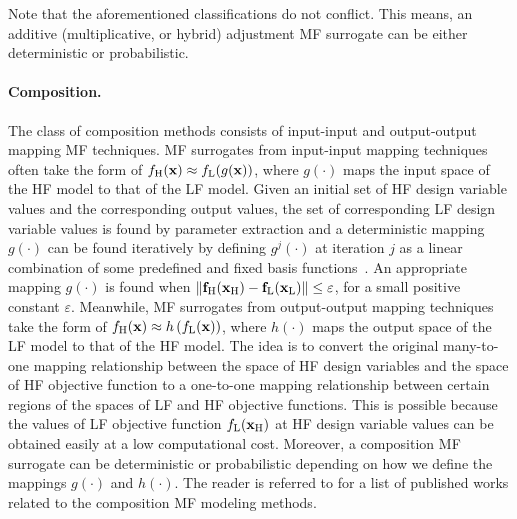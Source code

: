 \documentclass[iicol,sn-basic]{sn-jnl}%
\newcommand{\edit}[1]{\textcolor{red}{#1}} %
\begin{document}
Note that the aforementioned classifications do not conflict.
This means, an additive (multiplicative, or hybrid) adjustment MF surrogate can be either deterministic or probabilistic.

\paragraph{Composition.}
The class of composition methods consists of input-input and output-output mapping MF techniques.
MF surrogates from input-input mapping techniques often take the form of
{$f_\text{H}({\bf x}) \approx f_\text{L}(g({\bf x}))$,
  where
  $g(\cdot)$ maps the input space of the HF model to that of the LF model.}
Given an initial set of HF design variable values and the corresponding output values, the set of corresponding LF design variable values is found by parameter extraction and a deterministic mapping $g(\cdot)$ can be found iteratively by defining  $g^j(\cdot)$ at iteration $j$ as a linear combination of some predefined and fixed basis functions~\citep{Bandler1994}.
An appropriate mapping $g(\cdot)$ is found when $\| {\bf f}_\text{H}({\bf x}_\text{H}) - {\bf f}_\text{L}({\bf x}_\text{L})\| \leq \varepsilon$, for a small positive constant $\varepsilon$. 
Meanwhile, MF surrogates from output-output mapping techniques take the form of
{$f_\text{H}({\bf x}) \approx h\left(f_\text{L}({\bf x})\right)$,
  where $h(\cdot)$ maps the output space of the LF model to that of the HF model.}
The idea is to convert the original many-to-one mapping relationship between the space of HF design variables and the space of HF objective function to a one-to-one mapping relationship between certain regions of the spaces of LF and HF objective functions. 
This is possible because the values of LF objective function $f_\text{L}({\bf x}_\text{H})$ at HF design variable values can be obtained easily at a low computational cost.
Moreover, a composition MF surrogate can be deterministic or probabilistic depending on how we define the mappings $g(\cdot)$ and $h(\cdot)$.
The reader is referred to  for a list of published works related to the composition MF modeling methods.
\end{document}
